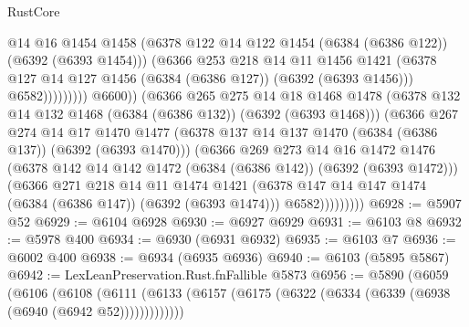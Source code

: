 \begin{lexlean}{RustCore}
\begin{coremodule}
                                  @14
                                  @16
                                  @1454
                                  @1458
                                  (@6378
                                    @122
                                    @14
                                    @122
                                    @1454
                                    (@6384 (@6386 @122))
                                    (@6392 (@6393 @1454)))
                                  (@6366
                                    @253
                                    @218
                                    @14
                                    @11
                                    @1456
                                    @1421
                                    (@6378
                                      @127
                                      @14
                                      @127
                                      @1456
                                      (@6384 (@6386 @127))
                                      (@6392 (@6393 @1456)))
                                    @6582)))))))))
                  @6600))
              (@6366
                @265
                @275
                @14
                @18
                @1468
                @1478
                (@6378 @132 @14 @132 @1468 (@6384 (@6386 @132)) (@6392 (@6393 @1468)))
                (@6366
                  @267
                  @274
                  @14
                  @17
                  @1470
                  @1477
                  (@6378 @137 @14 @137 @1470 (@6384 (@6386 @137)) (@6392 (@6393 @1470)))
                  (@6366
                    @269
                    @273
                    @14
                    @16
                    @1472
                    @1476
                    (@6378 @142 @14 @142 @1472 (@6384 (@6386 @142)) (@6392 (@6393 @1472)))
                    (@6366
                      @271
                      @218
                      @14
                      @11
                      @1474
                      @1421
                      (@6378 @147 @14 @147 @1474 (@6384 (@6386 @147)) (@6392 (@6393 @1474)))
                      @6582)))))))))
@6928 := @5907 @52
@6929 := @6104 @6928
@6930 := @6927 @6929
@6931 := @6103 @8
@6932 := @5978 @400
@6934 := @6930 (@6931 @6932)
@6935 := @6103 @7
@6936 := @6002 @400
@6938 := @6934 (@6935 @6936)
@6940 := @6103 (@5895 @5867)
@6942 := LexLeanPreservation.Rust.fnFallible @5873
@6956 := @5890
    (@6059
      (@6106
        (@6108
          (@6111 (@6133 (@6157 (@6175 (@6322 (@6334 (@6339 (@6938 (@6940 (@6942 @52)))))))))))))

\end{coremodule}
\end{lexlean}
